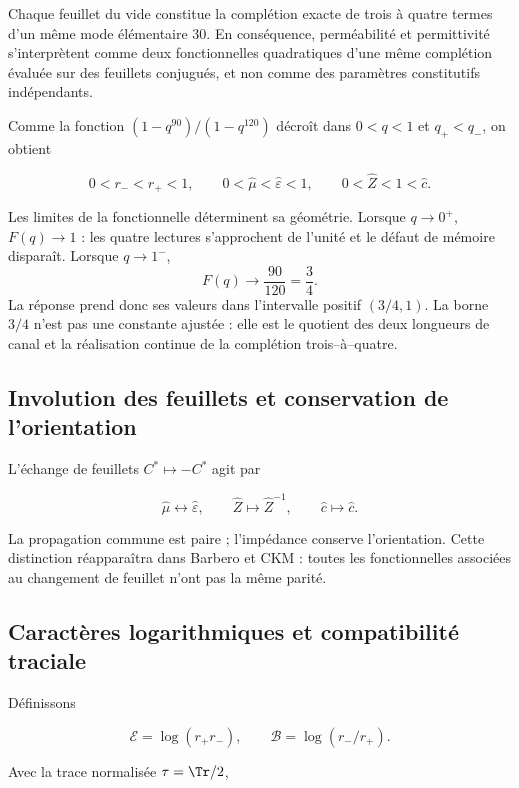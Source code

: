 Chaque feuillet du vide constitue la complétion exacte de trois à quatre
termes d'un même mode élémentaire \(30\). En conséquence, perméabilité
et permittivité s'interprètent comme deux fonctionnelles quadratiques d'une même
complétion évaluée sur des feuillets conjugués, et non comme des paramètres
constitutifs indépendants.

Comme la fonction \((1-q^{90})/(1-q^{120})\) décroît dans \(0<q<1\) et \(q_+<q_-\), on obtient

\[
0<r_-<r_+<1,\qquad
0<\widehat\mu<\widehat\varepsilon<1,\qquad
0<\widehat Z<1<\widehat c.
\]

Les limites de la fonctionnelle déterminent sa géométrie. Lorsque \(q\to0^+\),
\(F(q)\to1\) : les quatre lectures s'approchent de l'unité et le défaut de
mémoire disparaît. Lorsque \(q\to1^-\),
\[
F(q)\longrightarrow\frac{90}{120}=\frac34.
\]
La réponse prend donc ses valeurs dans l'intervalle positif \((3/4,1)\). La
borne \(3/4\) n'est pas une constante ajustée : elle est le quotient des deux
longueurs de canal et la réalisation continue de la complétion
trois--à--quatre.

\subsection{Involution des feuillets et conservation de l'orientation}

L'échange de feuillets \(C^*\mapsto-C^*\) agit par

\begin{equation}
\widehat\mu\longleftrightarrow\widehat\varepsilon,\qquad
\widehat Z\longmapsto\widehat Z^{-1},
\qquad
\widehat c\longmapsto\widehat c.
\label{p12-83-c13-s1:eq:vacuum-sheet}
\end{equation}

La propagation commune est paire ; l'impédance conserve l'orientation.
Cette distinction réapparaîtra dans Barbero et CKM : toutes les fonctionnelles
associées au changement de feuillet n'ont pas la même parité.

\subsection{Caractères logarithmiques et compatibilité traciale}

Définissons

\[
\mathcal E=\log(r_+r_-),\qquad
\mathcal B=\log(r_-/r_+).
\]

Avec la trace normalisée \(\tau=\Tr/2\),

